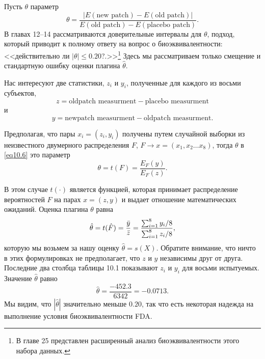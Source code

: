 Пусть $\theta$ параметр
\begin{equation}\label{eq10.6}
    \theta = \frac{\left|E(\text{new patch}) - E(\text{old patch})\right|}{E(\text{old patch}) - E(\text{placebo patch})}.
\end{equation}
В главах 12--14 рассматриваются доверительные интервалы для $\theta$, подход, который приводит к полному ответу на вопрос о биоэквивалентности: <<действительно ли $|\theta| \leq 0.20$?.>>\footnote{В главе 25 представлен расширенный анализ биоэквивалентности этого набора данных.} Здесь мы рассматриваем только смещение и стандартную ошибку оценки плагина $\hat{\theta}$.

Нас интересуют две статистики, $z_{i}$ и $y_{i}$, полученные для каждого из восьми субъектов,
\begin{equation}\label{eq10.7}
   z = \text{oldpatch measurment} - \text{placebo measurment}
\end{equation}
и
\begin{equation}\label{eq10.8}
   y = \text{newpatch measurment} - \text{oldpatch measurment}.
\end{equation}

Предполагая, что пары $x_{i} = (z_{i}, y_{i})$ получены путем случайной выборки из неизвестного двумерного распределения $F$, $F \rightarrow x = (x_{1}, x_{2} \dots x_{8})$, тогда $\theta$ в \ref{eq10.6} это параметр
\begin{equation}\label{eq10.9}
   \theta = t(F) = \frac{E_{F}(y)}{E_{F}(z)}.
\end{equation}

В этом случае $t(\cdot)$ является функцией, которая принимает распределение вероятностей $F$ на парах $x = (z, y)$ и выдает отношение математических ожиданий. Оценка плагина $\theta$ равна
\begin{equation}\label{eq10.10}
   \hat{\theta} = t(\hat{F}) = \frac{\Bar{y}}{\Bar{z}} = \frac{\sum_{i=1}^{8}y_{i}/8}{\sum_{i=1}^{8}z_{i}/8},
\end{equation}
которую мы возьмем за нашу оценку $\hat{\theta} = s(X)$. Обратите внимание, что ничто в этих формулировках не предполагает, что $z$ и $y$ независимы друг от друга. Последние два столбца таблицы 10.1 показывают $z_{i}$ и $y_{i}$ для восьми испытуемых. Значение $\hat{\theta}$ равно
\begin{equation}\label{eq10.11}
   \hat{\theta} = \frac{-452.3}{6342} = -0.0713.
\end{equation}
Мы видим, что $|\hat{\theta}|$ значительно меньше $0.20$, так что есть некоторая надежда на выполнение условия биоэквивалентности FDA.

